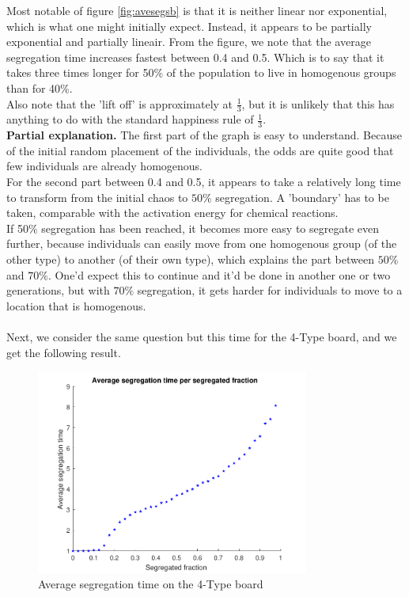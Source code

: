 Most notable of figure \ref{fig:avesegsb} is that it is neither linear nor exponential, which is what one might initially expect. Instead, it appears to be partially exponential and partially lineair. From the figure, we note that the average segregation time increases fastest between 0.4 and 0.5. 
Which is to say that it takes three times longer for 50\% of the population to live in homogenous groups than for 40\%.\\
Also note that the 'lift off' is approximately at $\frac{1}{3}$, but it is unlikely that this has anything to do with the standard happiness rule of $\frac{1}{3}$.\\
\textbf{Partial explanation.} The first part of the graph is easy to understand. Because of the initial random placement of the individuals, the odds are quite good that few individuals are already homogenous.\\
For the second part between 0.4 and 0.5, it appears to take a relatively long time to transform from the initial chaos to $50\%$ segregation. A 'boundary' has to be taken, comparable with the activation energy for chemical reactions.\\
If 50$\%$ segregation has been reached, it becomes more easy to segregate even further, because individuals can easily move from one homogenous group (of the other type) to another (of their own type), which explains the part between $50\%$ and $70\%$. One'd expect this to continue and it'd be done in another one or two generations, but with $70\%$ segregation, it gets harder for individuals to move to a location that is homogenous.\\
\\
Next, we consider the same question but this time for the 4-Type board, and we get the following result.


 \begin{figure}[H]
    \centering
    \includegraphics[width=0.8\textwidth]{aveseg_4b_2}
    \caption{Average segregation time on the 4-Type board}
    \label{fig:aveseg4b}
\end{figure}

